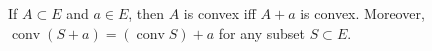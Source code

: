 If $A \subset E$ and $a \in E$, then $A$ is convex iff $A + a$ is convex. Moreover, $\operatorname{conv} (S + a) = (\operatorname{conv} S) + a$ for any subset $S \subset E$.